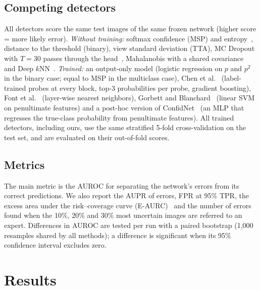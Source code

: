 \subsection{Competing detectors}
All detectors score the same test images of the same frozen network (higher score = more likely error).
\emph{Without training:} softmax confidence (MSP) and entropy~\cite{hendrycks2017}, distance to the threshold (binary), view standard
deviation (TTA), MC Dropout with $T=30$ passes through the head~\cite{gal2016}, Mahalanobis with a shared covariance~\cite{lee2018}
and Deep $k$NN~\cite{papernot2018}.
\emph{Trained:} an output-only model (logistic regression on $p$ and $p^2$ in the binary case; equal to MSP in the multiclass case),
Chen et al.~\cite{chen2019} (label-trained probes at every block, top-3 probabilities per probe, gradient boosting),
Font et al.~\cite{font2025} (layer-wise nearest neighbors), Gorbett and Blanchard~\cite{gorbett2022} (linear SVM on penultimate features)
and a post-hoc version of ConfidNet~\cite{corbiere2019} (an MLP that regresses the true-class probability from penultimate features).
All trained detectors, including ours, use the same stratified 5-fold cross-validation on the test set, and are evaluated on their
out-of-fold scores.

\subsection{Metrics}
The main metric is the AUROC for separating the network's errors from its correct predictions. We also report the AUPR of errors,
FPR at 95\% TPR, the excess area under the risk--coverage curve (E-AURC)~\cite{jaeger2023} and the number of errors found when the
10\%, 20\% and 30\% most uncertain images are referred to an expert. Differences in AUROC are tested per run with a paired bootstrap
(1,000 resamples shared by all methods); a difference is significant when its 95\% confidence interval excludes zero.

\section{Results}


